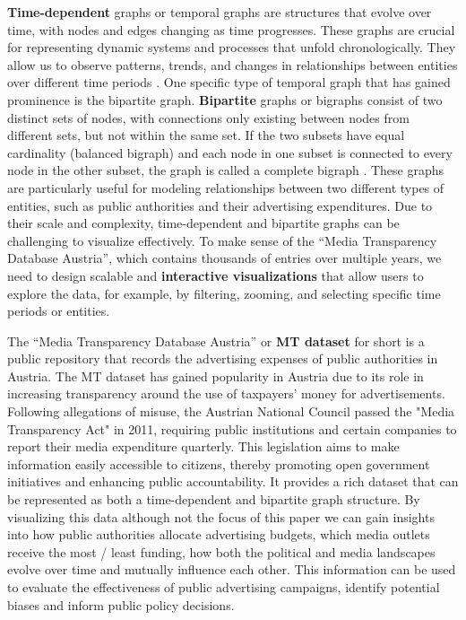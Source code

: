\documentclass{vgtc}
\begin{document}
\textbf{Time-dependent} graphs or temporal graphs are structures that evolve over time, with nodes and edges changing as time progresses. These graphs are crucial for representing dynamic systems and processes that unfold chronologically. They allow us to observe patterns, trends, and changes in relationships between entities over different time periods \cite{Waldner2020InteractiveEO}.
One specific type of temporal graph that has gained prominence is the bipartite graph. \textbf{Bipartite} graphs or bigraphs consist of two distinct sets of nodes, with connections only existing between nodes from different sets, but not within the same set. If the two subsets have equal cardinality (balanced bigraph) and each node in one subset is connected to every node in the other subset, the graph is called a complete bigraph \cite{diestel2012graph}. These graphs are particularly useful for modeling relationships between two different types of entities, such as public authorities and their advertising expenditures.
Due to their scale and complexity, time-dependent and bipartite graphs can be challenging to visualize effectively. To make sense of the ``Media Transparency Database Austria'', which contains thousands of entries over multiple years, we need to design scalable and \textbf{interactive visualizations} that allow users to explore the data, for example, by filtering, zooming, and selecting specific time periods or entities.

The ``Media Transparency Database Austria'' \cite{dataset} or \textbf{MT dataset} for short is a public repository that records the advertising expenses of public authorities in Austria. The MT dataset has gained popularity in Austria due to its role in increasing transparency around the use of taxpayers' money for advertisements. Following allegations of misuse, the Austrian National Council passed the "Media Transparency Act" in 2011, requiring public institutions and certain companies to report their media expenditure quarterly. This legislation aims to make information easily accessible to citizens, thereby promoting open government initiatives and enhancing public accountability.
It provides a rich dataset that can be represented as both a time-dependent and bipartite graph structure. By visualizing this data \textendash{} although not the focus of this paper \textendash{} we can gain insights into how public authorities allocate advertising budgets, which media outlets receive the most / least funding, how both the political and media landscapes evolve over time and mutually influence each other. This information can be used to evaluate the effectiveness of public advertising campaigns, identify potential biases and inform public policy decisions.
\end{document}
